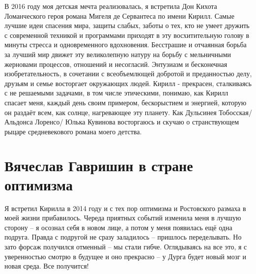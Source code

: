 \documentclass[../index.tex]{subfiles}
\begin{document}
	В 2016 году моя детская мечта реализовалась, я встретила Дон Кихота Ломанческого героя романа Мигеля де Сервантеса по имени Кирилл. Самые лучшие идеи спасения мира, защиты слабых, заботы о тех, кто не умеет дружить с современной техникой и программами приходят в эту восхитительную голову в минуты стресса и одновременного вдохновения. Бесстрашие и отчаянная борьба за лучший мир движет эту великолепную натуру на борьбу с мельничными жерновами процессов, отношений и несогласий. Энтузиазм и бесконечная изобретательность, в сочетании с всеобъемлющей добротой и преданностью делу, друзьям и семье восторгает окружающих людей. Кирилл - прекрасен, сталкиваясь с не решаемыми задачами, в том числе этическими, понимаю, как Кирилл спасает меня, каждый день своим примером, бескорыстием и энергией, которую он раздаёт всем, как солнце, нагревающее эту планету. Как Дульсинея Тобосская/ Альдонса Лоренсо/ Юлька Кувинова восторгаюсь и скучаю о странствующем рыцаре средневекового романа моего детства.
	
	
	\section{Вячеслав Гавришин в стране оптимизма}
	
	Я встретил Кирилла в 2014 году и с тех пор оптимизма и Ростовского размаха в моей жизни прибавилось. Череда приятных событий изменила меня в лучшую сторону -- я осознал себя в новом лице, а потом у меня появилась ещё одна подруга. Правда с подругой не сразу заладилось -- пришлось переделывать. Но зато форсаж получился отменный -- мы стали гибче. Оглядываясь на все это, я с уверенностью смотрю в будущее и оно прекрасно -- у Дурга будет новый мозг и новая среда. Все получится!
	
	
\end{document}
